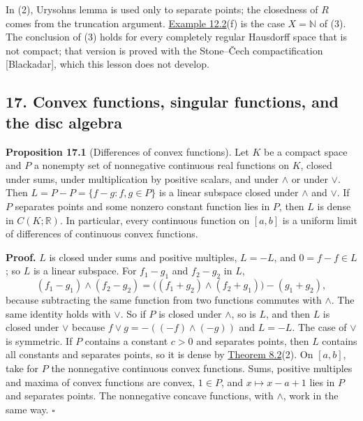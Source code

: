\documentclass[
  english,
  11pt,
  a4paper,
]{article}
\newcounter{none} %
\begin{document}
In (2), Urysohn\textquotesingle s lemma is used only to separate points;
the closedness of \(R\) comes from the truncation argument.
\hyperlink{the-stone-weierstrass-theorem-for-functions-vanishing-at-infinity--oa-fnd-sw-11}{Example
12.2}(f) is the case \(X=\mathbb N\) of (3). The conclusion of (3) holds
for every completely regular Hausdorff space that is not compact; that
version is proved with the Stone--Čech compactification {[}Blackadar{]},
which this lesson does not develop.

\subsection[17. Convex functions, singular functions, and the disc
algebra]{\texorpdfstring{\protect\hypertarget{the-stone-weierstrass-theorem-for-functions-vanishing-at-infinity--oa-fnd-sw-19}{}{}17.
Convex functions, singular functions, and the disc
algebra}{17. Convex functions, singular functions, and the disc algebra}}\label{the-stone-weierstrass-theorem-for-functions-vanishing-at-infinity--OA-FND-SW-19}

\textbf{Proposition 17.1} (Differences of convex functions). Let \(K\)
be a compact space and \(P\) a nonempty set of nonnegative continuous
real functions on \(K\), closed under sums, under multiplication by
positive scalars, and under \(\wedge\) or under \(\vee\). Then
\(L=P-P=\{f-g:f,g\in P\}\) is a linear subspace closed under \(\wedge\)
and \(\vee\). If \(P\) separates points and some nonzero constant
function lies in \(P\), then \(L\) is dense in \(C(K;\mathbb R)\). In
particular, every continuous function on \([a,b]\) is a uniform limit of
differences of continuous convex functions.

\textbf{Proof.} \(L\) is closed under sums and positive multiples,
\(L=-L\), and \(0=f-f\in L\); so \(L\) is a linear subspace. For
\(f_1-g_1\) and \(f_2-g_2\) in \(L\),
\[(f_1-g_1)\wedge(f_2-g_2)=\bigl((f_1+g_2)\wedge(f_2+g_1)\bigr)-(g_1+g_2),\]
because subtracting the same function from two functions commutes with
\(\wedge\). The same identity holds with \(\vee\). So if \(P\) is closed
under \(\wedge\), so is \(L\), and then \(L\) is closed under \(\vee\)
because \(f\vee g=-((-f)\wedge(-g))\) and \(L=-L\). The case of \(\vee\)
is symmetric. If \(P\) contains a constant \(c>0\) and separates points,
then \(L\) contains all constants and separates points, so it is dense
by
\hyperlink{the-stone-weierstrass-theorem-for-functions-vanishing-at-infinity--oa-fnd-sw-06}{Theorem
8.2}(2). On \([a,b]\), take for \(P\) the nonnegative continuous convex
functions. Sums, positive multiples and maxima of convex functions are
convex, \(1\in P\), and \(x\mapsto x-a+1\) lies in \(P\) and separates
points. The nonnegative concave functions, with \(\wedge\), work in the
same way. \(\square\)
\end{document}
